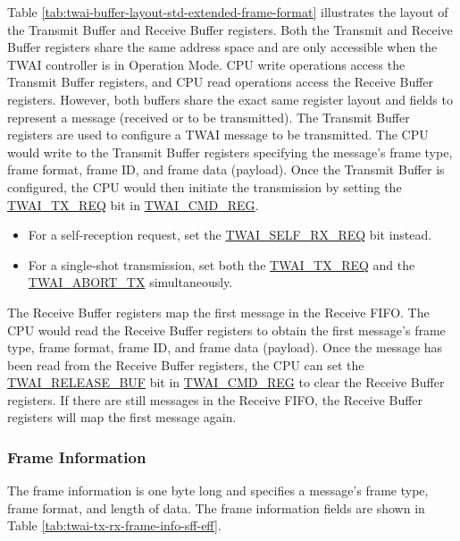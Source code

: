 \documentclass[main\_\_EN.tex]{subfiles}
\begin{document}


Table \ref{tab:twai-buffer-layout-std-extended-frame-format} illustrates the layout of the Transmit Buffer and Receive Buffer registers. Both the Transmit and Receive Buffer registers share the same address space and are only accessible when the TWAI controller is in Operation Mode. CPU write operations access the Transmit Buffer registers, and CPU read operations access the Receive Buffer registers. However, both buffers share the exact same register layout and fields to represent a message (received or to be transmitted).
The Transmit Buffer registers are used to configure a TWAI message to be transmitted. The CPU would write to the Transmit Buffer registers specifying the message's frame type, frame format, frame ID, and frame data (payload). Once the Transmit Buffer is configured, the CPU would then initiate the transmission by setting the  \hyperref[fielddesc:TWAITXREQ]{TWAI\_TX\_REQ} bit in \hyperref[regdesc:TWAICMDREG]{TWAI\_CMD\_REG}.

\begin{itemize}
    \item For a self-reception request, set the \hyperref[fielddesc:TWAISELFRXREQ]{TWAI\_SELF\_RX\_REQ} bit instead.
    \item For a single-shot transmission, set both the \hyperref[fielddesc:TWAITXREQ]{TWAI\_TX\_REQ} and the \hyperref[fielddesc:TWAIABORTTX]{TWAI\_ABORT\_TX} simultaneously.
\end{itemize}

The Receive Buffer registers map the first message in the Receive FIFO. The CPU would read the Receive Buffer registers to obtain the first message's frame type, frame format, frame ID, and frame data (payload). Once the message has been read from the Receive Buffer registers, the CPU can set the \hyperref[fielddesc:TWAIRELEASEBUF]{TWAI\_RELEASE\_BUF} bit in \hyperref[regdesc:TWAICMDREG]{TWAI\_CMD\_REG} to clear the Receive Buffer registers. If there are still messages in the Receive FIFO, the Receive Buffer registers will map the first message again.

\subsubsection{Frame Information}
The frame information is one byte long and specifies a message's frame type, frame format, and length of data. The frame information fields are shown in Table \ref{tab:twai-tx-rx-frame-info-sff-eff}.
\end{document}
